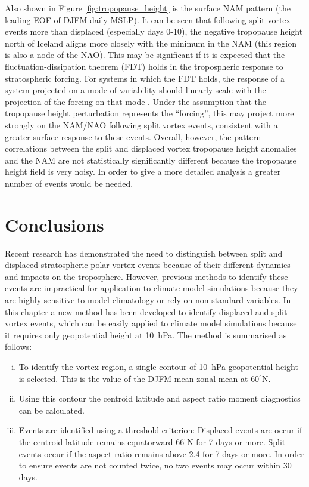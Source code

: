 Also shown in Figure \ref{fig:tropopause_height} is the surface NAM pattern (the
leading EOF of DJFM daily MSLP). It can be seen that following split vortex
events more than displaced (especially days 0-10), the negative tropopause
height north of Iceland aligns more closely with the minimum in the NAM (this
region is also a node of the NAO). This may be significant if it is expected
that the fluctuation-dissipation theorem (FDT) holds in the tropospheric
response to stratospheric forcing. For systems in which the FDT holds, the
response of a system projected on a mode of variability should linearly scale
with the projection of the forcing on that mode \citep{Ring2008}. Under the
assumption that the tropopause height perturbation represents the ``forcing'',
this may project more strongly on the NAM/NAO following split vortex events,
consistent with a greater surface response to these events. Overall, however,
the pattern correlations between the split and displaced vortex tropopause
height anomalies and the NAM are not statistically significantly different
because the tropopause height field is very noisy. In order to give a more
detailed analysis a greater number of events would be needed.


 


\section{Conclusions}

Recent research has demonstrated the need to distinguish between split and
displaced stratospheric polar vortex events because of their different dynamics
and impacts on the troposphere. However, previous methods to identify these
events are impractical for application to climate model simulations because they
are highly sensitive to model climatology or rely on non-standard variables. In
this chapter a new method has been developed to identify displaced and split
vortex events, which can be easily applied to climate model simulations because
it requires only geopotential height at 10~hPa. The method is summarised as
follows:
\begin{enumerate}[i.]
\item To identify the vortex region, a single contour of 10~hPa geopotential
  height is selected. This is the value of the DJFM mean zonal-mean at
  $60^{\circ}$N.
\item Using this contour the centroid latitude and aspect ratio moment
  diagnostics can be calculated.
\item Events are identified using a threshold criterion: Displaced events are
  occur if the centroid latitude remains equatorward $66^{\circ}$N for 7
  days or more. Split events occur if the aspect ratio remains above
  2.4 for 7 days or more. In order to ensure events are not counted twice, no
  two events may occur within 30 days.
\end{enumerate}

